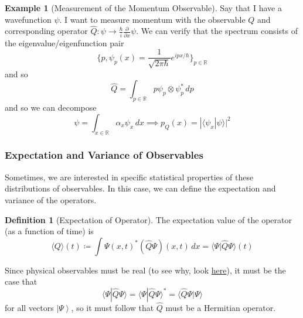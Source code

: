 \documentclass{article}
\newcommand{\ket}[1]{\ensuremath{\left|#1\right\rangle}}
\newcommand{\braket}[2]{\langle #1 | #2 \rangle}
\theoremstyle{definition}
\newtheorem{example}{Example}[section]
\newtheorem{definition}{Definition}[section]
\begin{document}
    \begin{example}[Measurement of the Momentum Observable]
      Say that I have a wavefunction $\psi$. I want to measure momentum with the observable $Q$ and corresponding operator $\hat{Q}: \psi \rightarrow \frac{\hbar}{i} \frac{\partial}{\partial x} \psi$. We can verify that the spectrum consists of the eigenvalue/eigenfunction pair 
      \begin{equation} 
        \bigg\{ p, \psi_p (x) = \frac{1}{\sqrt{2 \pi \hbar}} e^{i p x /\hbar} \bigg\}_{p \in \mathbb{R}}
      \end{equation}
      and so 
      \begin{equation} 
        \hat{Q} = \int_{p \in \mathbb{R}} p \psi_p \otimes \psi_p^\ast \,dp 
      \end{equation}
      and so we can decompose 
      \begin{equation} 
        \psi = \int_{x \in \mathbb{R}} \alpha_x \psi_x \,dx \implies p_Q (x) = |\braket{\psi_x}{\psi}|^2 
      \end{equation}
    \end{example}

    \subsubsection{Expectation and Variance of Observables}

      Sometimes, we are interested in specific statistical properties of these distributions of observables. In this case, we can define the expectation and variance of the operators. 

      \begin{definition}[Expectation of Operator]
        The expectation value of the operator (as a function of time) is
        \begin{equation} 
          \langle Q \rangle (t) \coloneqq \int \Psi (x, t)^\ast (\hat{Q} \Psi) (x, t) \,dx = \braket{\Psi}{\hat{Q} \Psi}(t)
        \end{equation}
      \end{definition}

      Since physical observables must be real (to see why, look \href{https://physics.stackexchange.com/questions/436462/why-is-there-a-physical-preference-to-real-numbers}{here}), it must be the case that 
      \begin{equation} 
        \braket{\Psi}{\hat{Q} \Psi} = \braket{\Psi}{\hat{Q} \Psi}^\ast = \braket{\hat{Q} \Psi}{\Psi}
      \end{equation}
      for all vectors $\ket{\Psi}$, so it must follow that $\hat{Q}$ must be a Hermitian operator. 
\end{document}
